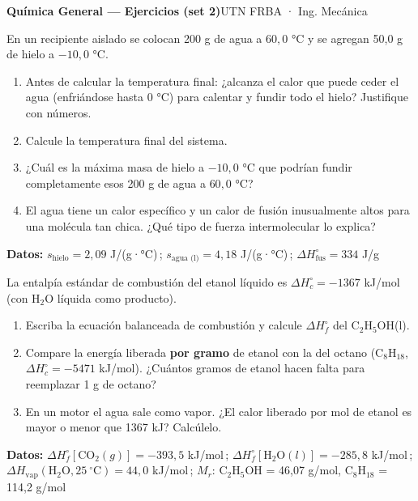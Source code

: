 \documentclass[11pt]{article}
\newcommand{\ejercicio}[1]{\par\vspace{10pt}{\large\bfseries\color{NavyBlue}Ejercicio #1}\par
  \nointerlineskip\vspace{2pt}{\color{NavyBlue!40}\rule{\linewidth}{0.4pt}}\par\vspace{2pt}}
\begin{document}
{\LARGE\bfseries Química General — Ejercicios (set 2)}\hfill{\small UTN FRBA · Ing. Mecánica}\par
\vspace{2pt}{\color{NavyBlue}\rule{\linewidth}{0.8pt}}\par

\ejercicio{1}
En un recipiente aislado se colocan 200 g de agua a \(60{,}0\) °C y se agregan 50,0 g de hielo a \(-10{,}0\) °C.
\begin{enumerate}
\item Antes de calcular la temperatura final: ¿alcanza el calor que puede ceder el agua (enfriándose hasta 0 °C) para calentar y fundir todo el hielo? Justifique con números.
\item Calcule la temperatura final del sistema.
\item ¿Cuál es la máxima masa de hielo a \(-10{,}0\) °C que podrían fundir completamente esos 200 g de agua a \(60{,}0\) °C?
\item El agua tiene un calor específico y un calor de fusión inusualmente altos para una molécula tan chica. ¿Qué tipo de fuerza intermolecular lo explica?
\end{enumerate}
\begin{datos}
\textbf{Datos:} \(s_{\text{hielo}} = 2{,}09\) J/(g·°C)\,; \(s_{\text{agua (l)}} = 4{,}18\) J/(g·°C)\,; \(\Delta H^\circ_{\text{fus}} = 334\) J/g
\end{datos}

\ejercicio{2}
La entalpía estándar de combustión del etanol líquido es \(\Delta H^\circ_c = -1367\) kJ/mol (con H\(_2\)O líquida como producto).
\begin{enumerate}
\item Escriba la ecuación balanceada de combustión y calcule \(\Delta H^\circ_f\) del C\(_2\)H\(_5\)OH(l).
\item Compare la energía liberada \textbf{por gramo} de etanol con la del octano (C\(_8\)H\(_{18}\), \(\Delta H^\circ_c = -5471\) kJ/mol). ¿Cuántos gramos de etanol hacen falta para reemplazar 1 g de octano?
\item En un motor el agua sale como vapor. ¿El calor liberado por mol de etanol es mayor o menor que 1367 kJ? Calcúlelo.
\end{enumerate}
\begin{datos}
\textbf{Datos:} \(\Delta H^\circ_f[\text{CO}_2(g)] = -393{,}5\) kJ/mol\,; \(\Delta H^\circ_f[\text{H}_2\text{O}(l)] = -285{,}8\) kJ/mol\,; \(\Delta H_{\text{vap}}(\text{H}_2\text{O}, 25\ ^\circ\text{C}) = 44{,}0\) kJ/mol\,; \(M_r\): C\(_2\)H\(_5\)OH = 46,07 g/mol, C\(_8\)H\(_{18}\) = 114,2 g/mol
\end{datos}
\end{document}
